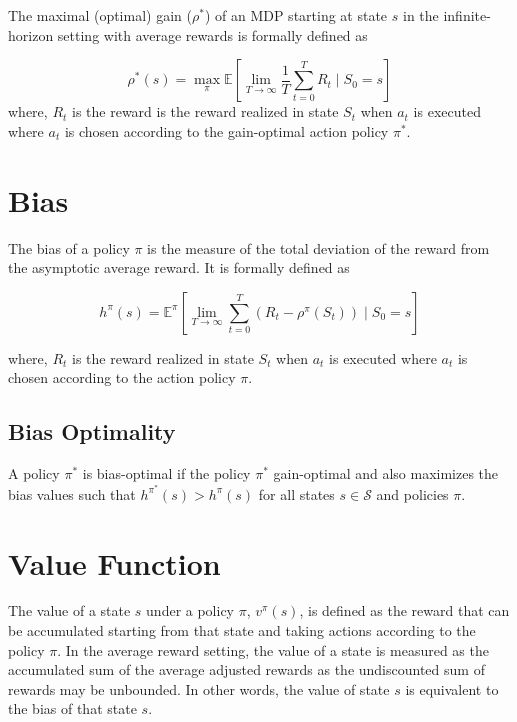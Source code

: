 The maximal (optimal) gain ($\rho^*$) of an MDP starting at state $s$ in the infinite-horizon setting with average rewards is formally defined as

\begin{equation}
    \label{eqn:gain_opt}
    \rho^*(s) = \max_\pi \mathbb{E}\left[\lim_{T \to \infty} \frac{1}{T} \sum_{t=0}^{T} R_t \mid S_0 = s\right]
\end{equation}
where, $R_t$ is the reward is the reward realized in state $S_t$ when $a_t$ is executed where $a_t$ is chosen according to the gain-optimal action policy $\pi^*$.

\section{Bias}

The bias of a policy $\pi$ is the measure of the total deviation of the reward from the asymptotic average reward.
It is formally defined as

\begin{equation}
    \label{eqn:bias}
    h^\pi(s) = \mathbb{E}^\pi\left[\lim_{T \to \infty} \sum_{t=0}^{T} (R_t - \rho^\pi(S_t)) \mid S_0 = s\right]
\end{equation}

where, $R_t$ is the reward realized in state $S_t$ when $a_t$ is executed where $a_t$ is chosen according to the action policy $\pi$.

\subsection*{Bias Optimality}

A policy $\pi^*$ is bias-optimal if the policy $\pi^*$ gain-optimal and also maximizes the bias values such that $h^{\pi^*} (s) > h^\pi(s)$ for all states $s \in \mathcal{S}$ and policies $\pi$.

\section{Value Function}

The value of a state $s$ under a policy $\pi$, $v^\pi(s)$, is defined as the reward that can be accumulated starting from that state and taking actions according to the policy $\pi$. 
In the average reward setting, the value of a state is measured as the accumulated sum of the average adjusted rewards as the undiscounted sum of rewards may be unbounded.
In other words, the value of state $s$ is equivalent to the bias of that state $s$.

